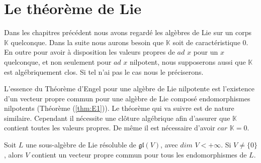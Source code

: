 \documentclass[a4paper,openany,12pt]{report}
\newcommand{\KK}{\mathbb{K}}
\newcommand{\gl}{\mathfrak{gl}}
\theoremstyle{break}
{\theorembodyfont{\upshape}
\newtheorem*{rmq}{Remarque :}
\newtheorem*{prv}{Preuve :}
\newtheorem*{ex}{Exemples :}
\newtheorem*{exe}{Exemple : }
\newtheorem*{nota}{Notation :}
\newtheorem*{dem}{D\'emonstration :}}
\begin{document}
\chapter{Le théorème de Lie}

Dans les chapitres précédent nous avons regardé les algèbres de Lie sur un corps $\KK$ quelconque. Dans la suite nous aurons besoin que $\KK$ soit de caractéristique $0$. En outre pour avoir à disposition les valeurs propres de $ad$ $x$ pour un $x$ quelconque, et non seulement pour $ad$ $x$ nilpotent, nous supposerons aussi que $\KK$ est algébriquement clos. Si tel n'ai pas le cas nous le préciserons.

L'essence du Théorème d'Engel pour une algèbre de Lie nilpotente est l’existence d'un vecteur propre commun pour une algèbre de Lie composé endomorphismes nilpotents (Théorème (\ref{thm:E1})). Le théorème qui va suivre est de nature similaire. Cependant il nécessite une clôture algébrique afin d'assurer que $\KK$ contient toutes les valeurs propres. De même il est nécessaire d'avoir $car$ $\KK =0$.

\begin{thm}\label{thm:L1}
\quad Soit $L$ une sous-algèbre de Lie résoluble de $\gl(V)$, avec $dim$ $V < +\infty$. Si $V \neq \{0\}$, alors $V$ contient un vecteur propre commun pour tous les endomorphismes de $L$.
\end{thm}
\end{document}
